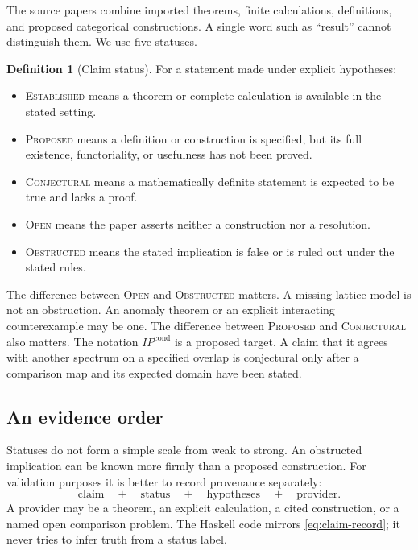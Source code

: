 \documentclass[12pt]{article}
\theoremstyle{definition}
\newtheorem{definition}[theorem]{Definition}
\theoremstyle{remark}
\newcommand{\IP}{\mathit{IP}}
\newcommand{\EST}{\textnormal{\textsc{Established}}}
\newcommand{\PROP}{\textnormal{\textsc{Proposed}}}
\newcommand{\CONJ}{\textnormal{\textsc{Conjectural}}}
\newcommand{\OPEN}{\textnormal{\textsc{Open}}}
\newcommand{\OBST}{\textnormal{\textsc{Obstructed}}}
\begin{document}
The source papers combine imported theorems, finite calculations,
definitions, and proposed categorical constructions.  A single word such as
``result'' cannot distinguish them.  We use five statuses.

\begin{definition}[Claim status]
For a statement made under explicit hypotheses:
\begin{itemize}[leftmargin=2.1em]
  \item \EST{} means a theorem or complete calculation is available in the
  stated setting.
  \item \PROP{} means a definition or construction is specified, but its
  full existence, functoriality, or usefulness has not been proved.
  \item \CONJ{} means a mathematically definite statement is expected to be
  true and lacks a proof.
  \item \OPEN{} means the paper asserts neither a construction nor a
  resolution.
  \item \OBST{} means the stated implication is false or is ruled out under
  the stated rules.
\end{itemize}
\end{definition}

The difference between \OPEN{} and \OBST{} matters.  A missing lattice model
is not an obstruction.  An anomaly theorem or an explicit interacting
counterexample may be one.  The difference between \PROP{} and \CONJ{} also
matters.  The notation $\IP^{\mathrm{cond}}$ is a proposed target.  A claim
that it agrees with another spectrum on a specified overlap is conjectural
only after a comparison map and its expected domain have been stated.

\subsection{An evidence order}

Statuses do not form a simple scale from weak to strong.  An obstructed
implication can be known more firmly than a proposed construction.  For
validation purposes it is better to record provenance separately:
\begin{equation}
\text{claim}\quad+\quad\text{status}\quad+\quad
\text{hypotheses}\quad+\quad\text{provider}.
\label{eq:claim-record}
\end{equation}
A provider may be a theorem, an explicit calculation, a cited construction,
or a named open comparison problem.  The Haskell code mirrors
\cref{eq:claim-record}; it never tries to infer truth from a status label.
\end{document}
